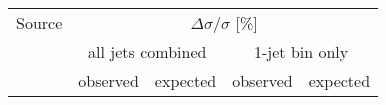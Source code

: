 \begin{table}[htdp]
\begin{center}
   \begin{tabular}{l|c|c|c|c}
    \hline
    Source & \multicolumn{4}{c}{$\Delta\sigma/\sigma$ [\%]}\\
           & \multicolumn{2}{c}{ all jets combined} & \multicolumn{2}{c}{ 1-jet bin only} \\
           & observed & expected & observed & expected \\
    \hline \hline
%
%

\end{tabular}
\end{center}
\end{table}
